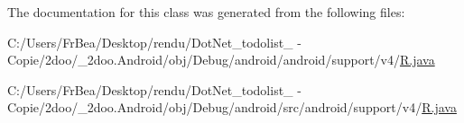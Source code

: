 The documentation for this class was generated from the following files:\begin{CompactItemize}
\item 
C:/Users/FrBea/Desktop/rendu/DotNet\_\-todolist\_ - Copie/2doo/\_\-2doo.Android/obj/Debug/android/android/support/v4/\hyperlink{android_2support_2v4_2_r_8java}{R.java}\item 
C:/Users/FrBea/Desktop/rendu/DotNet\_\-todolist\_ - Copie/2doo/\_\-2doo.Android/obj/Debug/android/src/android/support/v4/\hyperlink{src_2android_2support_2v4_2_r_8java}{R.java}\end{CompactItemize}

